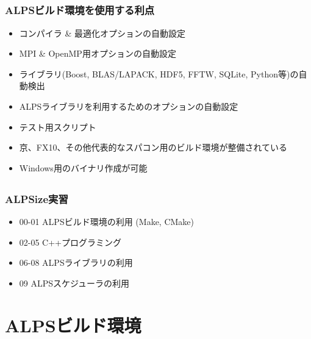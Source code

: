 \subsection*{\redm\whitem\greenb}
\begin{frame}
  \frametitle{ALPSビルド環境を使用する利点}
  \begin{itemize}
  \item コンパイラ \& 最適化オプションの自動設定
  \item MPI \& OpenMP用オプションの自動設定
  \item ライブラリ(Boost, BLAS/LAPACK, HDF5, FFTW, SQLite, Python等)の自動検出
  \item ALPSライブラリを利用するためのオプションの自動設定
  \item テスト用スクリプト
  \item 京、FX10、その他代表的なスパコン用のビルド環境が整備されている
  \item Windows用のバイナリ作成が可能
  \end{itemize}
\end{frame}

\subsection*{\redm\whitem\greenb}
\begin{frame}
  \frametitle{ALPSize実習}
  \begin{itemize}
    \setlength{\itemsep}{1em}
  \item 00-01 ALPSビルド環境の利用 (Make, CMake)
  \item 02-05 C++プログラミング
  \item 06-08 ALPSライブラリの利用
  \item 09 ALPSスケジューラの利用
  \end{itemize}
\end{frame}

\section{ALPSビルド環境}

